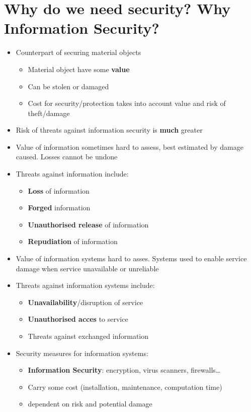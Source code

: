 \documentclass[11pt,british,faculty=ea,layout=titlefont,underline=false,titleUppercase=true,titleUnderline=true,hidelinks]{ugent2016-report}
\begin{document}
\section{Why do we need security? Why Information Security?} \label{sec:why-do-we-need-security}
	\begin{itemize}
		\item Counterpart of securing material objects
			\begin{itemize}
				\item Material object have some \textbf{value}
				\item Can be stolen or damaged
				\item Cost for security/protection takes into account value and risk of theft/damage
			\end{itemize}
		\item Risk of threats against information security is \textbf{much} greater
		\item Value of information sometimes hard to assess, best estimated by damage caused. Losses cannot be undone
		\item Threats against information include:
			\begin{itemize}
				\item \textbf{Loss} of information
				\item \textbf{Forged} information
				\item \textbf{Unauthorised release} of information
				\item \textbf{Repudiation} of information
			\end{itemize}
		\item Value of information systems hard to asses. Systems used to enable service \rightarrow damage when service unavailable or unreliable
		\item Threats against information systems include:
			\begin{itemize}
				\item \textbf{Unavailability}/disruption of service
				\item \textbf{Unauthorised acces} to service
				\item Threats against exchanged information
			\end{itemize}
		\item Security measures for information systems:
		\begin{itemize}
			\item \textbf{Information Security}: encryption, virus scanners, firewalls\dots
			\item Carry some cost (installation, maintenance, computation time)
			\item dependent on risk and potential damage
		\end{itemize}
	\end{itemize}
\end{document}
